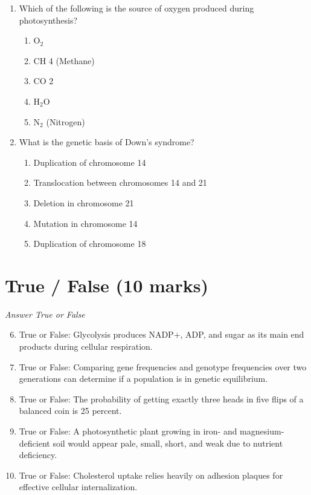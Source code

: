\documentclass[12pt]{article}
\begin{document}
\begin{enumerate}[label=\arabic*.]
\begin{enumerate}[label=(\alph*)]
    \item Oxygen is solely responsible for stimulating brain activity.
    \item Oxygen is used to synthesize proteins in cells.
\end{enumerate}
\item Which of the following is the source of oxygen produced during photosynthesis?
\begin{enumerate}[label=(\alph*)]
    \item O$_{2}$
    \item CH 4 (Methane)
    \item CO 2
    \item H$_{2}$O
    \item N$_{2}$ (Nitrogen)
\end{enumerate}
\item What is the genetic basis of Down's syndrome?
\begin{enumerate}[label=(\alph*)]
    \item Duplication of chromosome 14
    \item Translocation between chromosomes 14 and 21
    \item Deletion in chromosome 21
    \item Mutation in chromosome 14
    \item Duplication of chromosome 18
\end{enumerate}
\end{enumerate}

\section*{True / False (10 marks)}
\textit{Answer True or False}
\begin{enumerate}[label=\arabic*.]
\setcounter{enumi}{5}
\item True or False: Glycolysis produces NADP+, ADP, and sugar as its main end products during cellular respiration.
\item True or False: Comparing gene frequencies and genotype frequencies over two generations can determine if a population is in genetic equilibrium.
\item True or False: The probability of getting exactly three heads in five flips of a balanced coin is 25 percent.
\item True or False: A photosynthetic plant growing in iron- and magnesium-deficient soil would appear pale, small, short, and weak due to nutrient deficiency.
\item True or False: Cholesterol uptake relies heavily on adhesion plaques for effective cellular internalization.
\end{enumerate}
\end{document}
